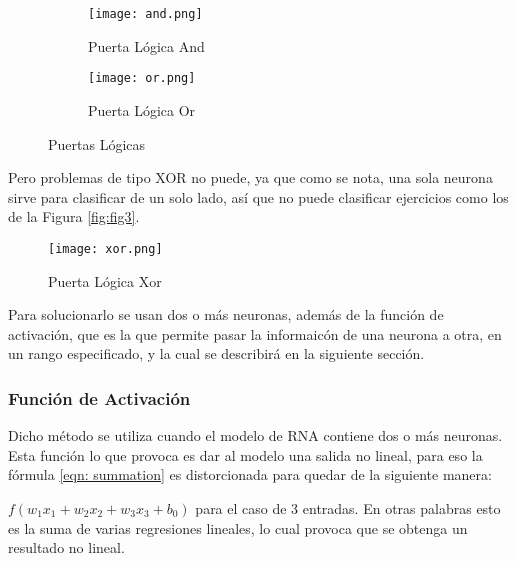         \begin{figure}[H]
            \begin{subfigure}[H]{0.49\textwidth}
                \texttt{[image: and.png]}
                \caption{Puerta L\'ogica And}
                \label{fig:f1}
            \end{subfigure}
            \hfill
            \begin{subfigure}[H]{0.49\textwidth}
                \texttt{[image: or.png]}
                \caption{Puerta L\'ogica Or}
                \label{fig:f2}  %
            \end{subfigure}
            \caption{Puertas L\'ogicas}
        \end{figure}
        
        Pero problemas de tipo XOR no puede, ya que como se nota, una sola neurona sirve para 
        clasificar de un solo lado, así que no puede clasificar ejercicios
        como los de la Figura \eqref{fig:fig3}.

        \begin{figure}[H]
            \centering
            \texttt{[image: xor.png]}
            \caption{Puerta L\'ogica Xor}
            \label{fig:fig3}
        \end{figure}

        Para solucionarlo se usan dos o m\'as neuronas, adem\'as de la funci\'on de activaci\'on, que es la que permite pasar la informaicón de una neurona a otra, en un rango especificado, y la cual se describirá en la siguiente sección.

            \subsubsection{Funci\'on de Activaci\'on} \label{sec: activation}
            
            
                Dicho m\'etodo se utiliza cuando el modelo de RNA contiene dos o m\'as neuronas.
                Esta funci\'on lo que provoca es dar al modelo una salida no lineal, para 
                eso la f\'ormula \eqref{eqn: summation} es distorcionada para quedar de la siguiente 
                manera: 
           
                    $f( w_1x_1 + w_2x_2 + w_3x_3 + b_0)$ para el caso de 3 entradas.              
                En otras palabras esto es la suma de varias regresiones lineales, lo cual provoca que se obtenga 
                un resultado no lineal. \\
                
